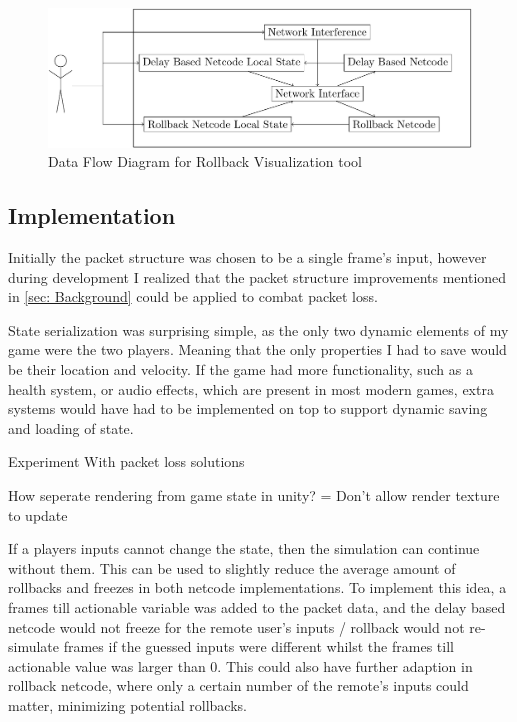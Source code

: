 \documentclass{entcs}
\begin{document}
\begin{figure}[h]
\centering
\includegraphics[width=\textwidth]{UIDesign}
\caption{Data Flow Diagram for Rollback Visualization tool}
\label{fig:DFD}
\end{figure}

\subsection{Implementation}

Initially the packet structure was chosen to be a single frame's input, however during development I realized that the packet structure improvements mentioned in \ref{sec: Background} could be applied to combat packet loss.

State serialization was surprising simple, as the only two dynamic elements of my game were the two players. Meaning that the only properties I had to save would be their location and velocity. If the game had more functionality, such as a health system, or audio effects, which are present in most modern games, extra systems would have had to be implemented on top to support dynamic saving and loading of state.

Experiment With packet loss solutions


How seperate rendering from game state in unity? = Don't allow render texture to update


If a players inputs cannot change the state, then the simulation can continue without them. This can be used to slightly reduce the average amount of rollbacks and freezes in both netcode implementations. To implement this idea, a frames till actionable variable was added to the packet data, and the delay based netcode would not freeze for the remote user's inputs / rollback would not re-simulate frames if the guessed inputs were different whilst the frames till actionable value was larger than 0. This could also have further adaption in rollback netcode, where only a certain number of the remote's inputs could matter, minimizing potential rollbacks.
\end{document}
